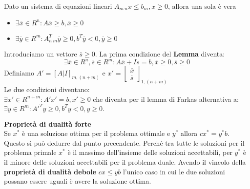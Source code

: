 \documentclass{article}
\begin{document}
\begin{tcolorbox}[
    colback=lightgray,
    colframe=black,
    coltext=black,
    title=Versione alternativa di Farkas,
    colbacktitle=black,
    coltitle=lightgray,
    breakable
  ]
  Dato un sistema di equazioni lineari $A_{m\ n}x\le b_m, x \ge 0$, allora una sola è vera\\
  \begin{itemize}
    \item $\exists \overline{x} \in R^n: A\overline{x}\ge b, \overline{x}\ge 0$
    \item $\exists \overline{y} \in R^m: A^T_{n\ m}\overline{y}\ge 0, b^T\overline{y} < 0, \overline{y} \ge 0$
  \end{itemize}

  Introduciamo un vettore $\overline{s} \ge 0$. La prima condizione del \textbf{Lemma} diventa: $$ \exists \overline{x} \in R^n, \overline{s} \in R^m: A\overline{x}+Is=b, \overline{x} \ge 0, \overline{s} \ge 0$$
  Definiamo $A'=[A|I]_{m, (n+m)}$ e $x'=\begin{bmatrix}\overline{x} \\ \overline{s}\end{bmatrix}_{1, (n+m)}$\\
  Le due condizioni diventano: \\
  $\exists x' \in R^{n+m} : A'x' = b, x' \ge 0$ che diventa per il lemma di Farkas alternativa a:\\ $\exists y \in R^m : A'^T y \ge 0, b^T y < 0, y \ge 0.$
\end{tcolorbox}
\textbf{Proprietà di dualità forte}\\
Se ${x}^{\ast}$ è una soluzione ottima per il problema ottimale e ${  y}^{\ast}$ allora $cx^{\ast}=y^{\ast}b$. Questo si può dedurre dal punto precendente. Perché tra tutte le soluzioni per il problema primale $x^{\ast}$ è il massimo dell'insieme delle soluzioni accettabili, per $y^{\ast}$ è il minore delle soluzioni accettabili per il problema duale. Avendo il vincolo della \textbf{proprietà  di dualità debole} $cx\le yb$ l'unico caso in cui le due soluzioni possano essere uguali è avere la soluzione ottima.
\end{document}
